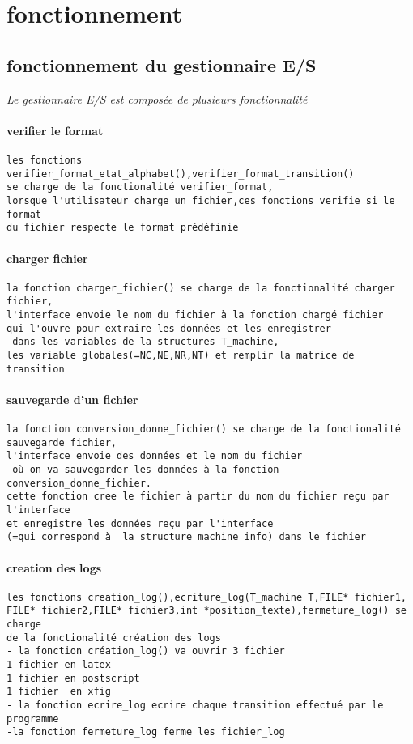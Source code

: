 \documentclass{article}
\begin{document}
\section{fonctionnement}

\subsection{fonctionnement du gestionnaire E/S}

\textit{Le gestionnaire E/S est composée de plusieurs fonctionnalité}

\paragraph{verifier le format}
\begin{verbatim}
les fonctions verifier_format_etat_alphabet(),verifier_format_transition()
se charge de la fonctionalité verifier_format,
lorsque l'utilisateur charge un fichier,ces fonctions verifie si le format 
du fichier respecte le format prédéfinie 
\end{verbatim}

\paragraph{charger fichier}
\begin{verbatim}
la fonction charger_fichier() se charge de la fonctionalité charger fichier,
l'interface envoie le nom du fichier à la fonction chargé fichier
qui l'ouvre pour extraire les données et les enregistrer 
 dans les variables de la structures T_machine,
les variable globales(=NC,NE,NR,NT) et remplir la matrice de transition
\end{verbatim}

\paragraph{sauvegarde d'un fichier}
\begin{verbatim}
la fonction conversion_donne_fichier() se charge de la fonctionalité 
sauvegarde fichier,
l'interface envoie des données et le nom du fichier
 où on va sauvegarder les données à la fonction conversion_donne_fichier.
cette fonction cree le fichier à partir du nom du fichier reçu par l'interface 
et enregistre les données reçu par l'interface
(=qui correspond à  la structure machine_info) dans le fichier
\end{verbatim}
\paragraph{creation des logs}
\begin{verbatim}
les fonctions creation_log(),ecriture_log(T_machine T,FILE* fichier1,
FILE* fichier2,FILE* fichier3,int *position_texte),fermeture_log() se charge
de la fonctionalité création des logs
- la fonction création_log() va ouvrir 3 fichier
1 fichier en latex
1 fichier en postscript
1 fichier  en xfig
- la fonction ecrire_log ecrire chaque transition effectué par le programme
-la fonction fermeture_log ferme les fichier_log

\end{verbatim}
\end{document}
